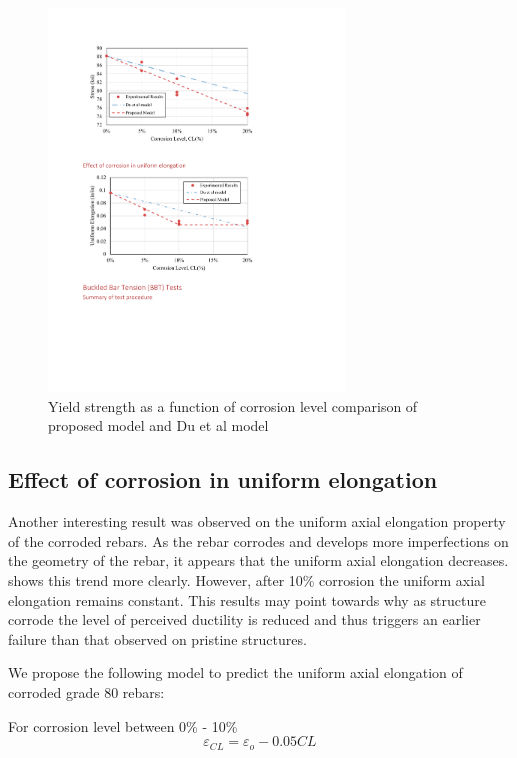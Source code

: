 \begin{figure}[htbp]
	\centering
	\includegraphics[width=0.7\textwidth]{VAC Thesis 2.0/Chapter-4/figs/TensionTest_results_3_proposedmodel.pdf}
	\caption{Yield strength as a function of corrosion level comparison of proposed model and Du et al model \cite{Du2005}}
	\label{fig:Calderon_vs_Du}
\end{figure}

\subsection{Effect of corrosion in uniform elongation}

Another interesting result was observed on the uniform axial elongation property of the corroded rebars. As the rebar corrodes and develops more imperfections on the geometry of the rebar, it appears that the uniform axial elongation decreases. shows this trend more clearly. However, after 10\% corrosion the uniform axial elongation remains constant. This results may point towards why as structure corrode the level of perceived ductility is reduced and thus triggers an earlier failure than that observed on pristine structures.

We propose the following model to predict the uniform axial elongation of corroded grade 80 rebars:

For corrosion level between 0\% - 10\%
\begin{equation}
    \varepsilon_{CL} = \varepsilon_{o}-0.05CL
    \label{eq.Calderon_UAE_vs_CL}
\end{equation}

